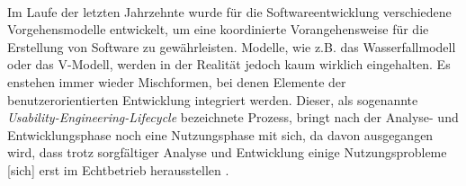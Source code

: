 \\
Im Laufe der letzten Jahrzehnte wurde für die Softwareentwicklung verschiedene Vorgehensmodelle entwickelt, um eine koordinierte Vorangehensweise für die Erstellung von Software zu gewährleisten. Modelle, wie z.B. das Wasserfallmodell oder das V-Modell, werden in der Realität jedoch kaum wirklich eingehalten. Es enstehen immer wieder Mischformen, bei denen Elemente der benutzerorientierten Entwicklung integriert werden. Dieser, als sogenannte \textit{Usability-Engineering-Lifecycle} bezeichnete Prozess, bringt nach der Analyse- und Entwicklungsphase noch eine Nutzungsphase mit sich, da davon ausgegangen wird, dass \glqq trotz sorgfältiger Analyse und Entwicklung einige Nutzungsprobleme [sich] erst im Echtbetrieb herausstellen\grqq{} \cite{lifecycle}.




